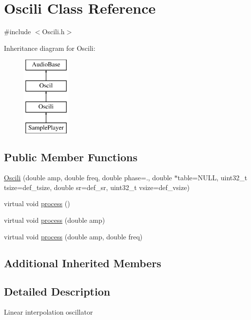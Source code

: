 \hypertarget{class_oscili}{}\section{Oscili Class Reference}
\label{class_oscili}


{\ttfamily \#include $<$Oscili.\+h$>$}

Inheritance diagram for Oscili\+:\begin{figure}[H]
\begin{center}
\leavevmode
\includegraphics[height=4.000000cm]{class_oscili}
\end{center}
\end{figure}
\subsection*{Public Member Functions}
\begin{DoxyCompactItemize}
\item 
\hyperlink{class_oscili_a67e6c220007c24a72456680645c0bfa0}{Oscili} (double amp, double freq, double phase=., double $\ast$table=N\+U\+LL, uint32\+\_\+t tsize=def\+\_\+tsize, double sr=def\+\_\+sr, uint32\+\_\+t vsize=def\+\_\+vsize)
\item 
virtual void \hyperlink{class_oscili_a2571464f3b4874c3ca691061e8db7d32}{process} ()
\item 
virtual void \hyperlink{class_oscili_a1fb47dff09f771481e1a1d2fde39d775}{process} (double amp)
\item 
virtual void \hyperlink{class_oscili_a053ace3b633b645c4b8a517009ea7389}{process} (double amp, double freq)
\end{DoxyCompactItemize}
\subsection*{Additional Inherited Members}


\subsection{Detailed Description}
Linear interpolation oscillator 

